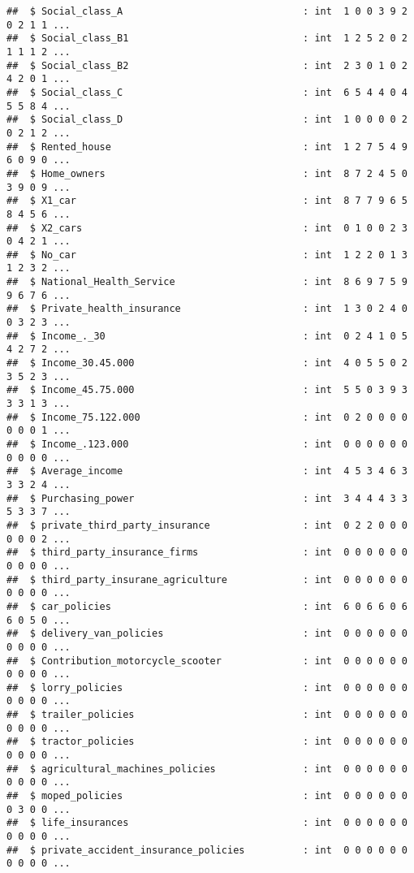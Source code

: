 \documentclass[]{article}
\begin{document}
\begin{verbatim}
##  $ Social_class_A                               : int  1 0 0 3 9 2 0 2 1 1 ...
##  $ Social_class_B1                              : int  1 2 5 2 0 2 1 1 1 2 ...
##  $ Social_class_B2                              : int  2 3 0 1 0 2 4 2 0 1 ...
##  $ Social_class_C                               : int  6 5 4 4 0 4 5 5 8 4 ...
##  $ Social_class_D                               : int  1 0 0 0 0 2 0 2 1 2 ...
##  $ Rented_house                                 : int  1 2 7 5 4 9 6 0 9 0 ...
##  $ Home_owners                                  : int  8 7 2 4 5 0 3 9 0 9 ...
##  $ X1_car                                       : int  8 7 7 9 6 5 8 4 5 6 ...
##  $ X2_cars                                      : int  0 1 0 0 2 3 0 4 2 1 ...
##  $ No_car                                       : int  1 2 2 0 1 3 1 2 3 2 ...
##  $ National_Health_Service                      : int  8 6 9 7 5 9 9 6 7 6 ...
##  $ Private_health_insurance                     : int  1 3 0 2 4 0 0 3 2 3 ...
##  $ Income_._30                                  : int  0 2 4 1 0 5 4 2 7 2 ...
##  $ Income_30.45.000                             : int  4 0 5 5 0 2 3 5 2 3 ...
##  $ Income_45.75.000                             : int  5 5 0 3 9 3 3 3 1 3 ...
##  $ Income_75.122.000                            : int  0 2 0 0 0 0 0 0 0 1 ...
##  $ Income_.123.000                              : int  0 0 0 0 0 0 0 0 0 0 ...
##  $ Average_income                               : int  4 5 3 4 6 3 3 3 2 4 ...
##  $ Purchasing_power                             : int  3 4 4 4 3 3 5 3 3 7 ...
##  $ private_third_party_insurance                : int  0 2 2 0 0 0 0 0 0 2 ...
##  $ third_party_insurance_firms                  : int  0 0 0 0 0 0 0 0 0 0 ...
##  $ third_party_insurane_agriculture             : int  0 0 0 0 0 0 0 0 0 0 ...
##  $ car_policies                                 : int  6 0 6 6 0 6 6 0 5 0 ...
##  $ delivery_van_policies                        : int  0 0 0 0 0 0 0 0 0 0 ...
##  $ Contribution_motorcycle_scooter              : int  0 0 0 0 0 0 0 0 0 0 ...
##  $ lorry_policies                               : int  0 0 0 0 0 0 0 0 0 0 ...
##  $ trailer_policies                             : int  0 0 0 0 0 0 0 0 0 0 ...
##  $ tractor_policies                             : int  0 0 0 0 0 0 0 0 0 0 ...
##  $ agricultural_machines_policies               : int  0 0 0 0 0 0 0 0 0 0 ...
##  $ moped_policies                               : int  0 0 0 0 0 0 0 3 0 0 ...
##  $ life_insurances                              : int  0 0 0 0 0 0 0 0 0 0 ...
##  $ private_accident_insurance_policies          : int  0 0 0 0 0 0 0 0 0 0 ...

\end{verbatim}
\end{document}
